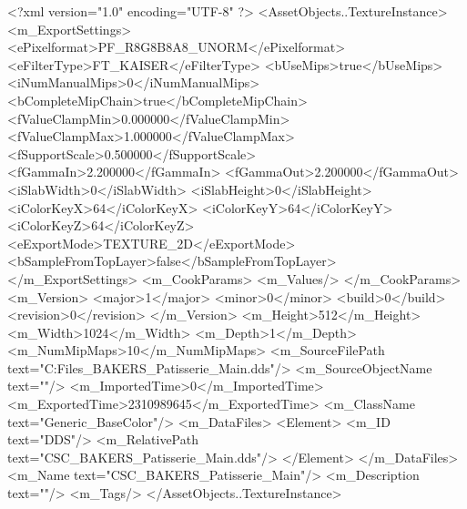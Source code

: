<?xml version="1.0" encoding="UTF-8" ?>
<AssetObjects..TextureInstance>
	<m_ExportSettings>
		<ePixelformat>PF_R8G8B8A8_UNORM</ePixelformat>
		<eFilterType>FT_KAISER</eFilterType>
		<bUseMips>true</bUseMips>
		<iNumManualMips>0</iNumManualMips>
		<bCompleteMipChain>true</bCompleteMipChain>
		<fValueClampMin>0.000000</fValueClampMin>
		<fValueClampMax>1.000000</fValueClampMax>
		<fSupportScale>0.500000</fSupportScale>
		<fGammaIn>2.200000</fGammaIn>
		<fGammaOut>2.200000</fGammaOut>
		<iSlabWidth>0</iSlabWidth>
		<iSlabHeight>0</iSlabHeight>
		<iColorKeyX>64</iColorKeyX>
		<iColorKeyY>64</iColorKeyY>
		<iColorKeyZ>64</iColorKeyZ>
		<eExportMode>TEXTURE_2D</eExportMode>
		<bSampleFromTopLayer>false</bSampleFromTopLayer>
	</m_ExportSettings>
	<m_CookParams>
		<m_Values/>
	</m_CookParams>
	<m_Version>
		<major>1</major>
		<minor>0</minor>
		<build>0</build>
		<revision>0</revision>
	</m_Version>
	<m_Height>512</m_Height>
	<m_Width>1024</m_Width>
	<m_Depth>1</m_Depth>
	<m_NumMipMaps>10</m_NumMipMaps>
	<m_SourceFilePath text="C:\Users\Shadow\Desktop\Working Files\Textures\CSC_BAKERS_Patisserie_Main.dds"/>
	<m_SourceObjectName text=""/>
	<m_ImportedTime>0</m_ImportedTime>
	<m_ExportedTime>2310989645</m_ExportedTime>
	<m_ClassName text="Generic_BaseColor"/>
	<m_DataFiles>
		<Element>
			<m_ID text="DDS"/>
			<m_RelativePath text="CSC_BAKERS_Patisserie_Main.dds"/>
		</Element>
	</m_DataFiles>
	<m_Name text="CSC_BAKERS_Patisserie_Main"/>
	<m_Description text=""/>
	<m_Tags/>
</AssetObjects..TextureInstance>

